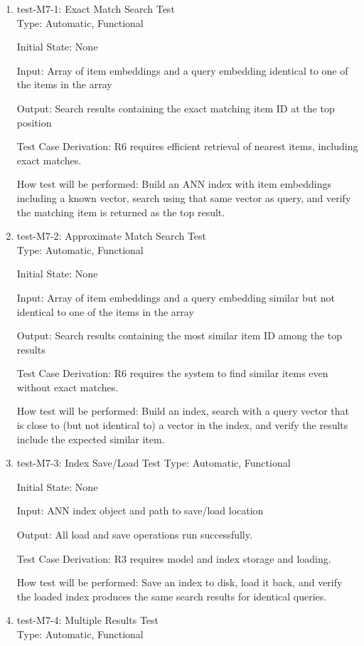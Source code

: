 \documentclass[12pt, titlepage]{article}
\begin{document}
\begin{enumerate}

  \item{test-M7-1: Exact Match Search Test\\}
  Type: Automatic, Functional
            
  Initial State: None
            
  Input: Array of item embeddings and a query embedding identical to one of the items in the array
            
  Output: Search results containing the exact matching item ID at the top position
  
  Test Case Derivation: R6 requires efficient retrieval of nearest items, including exact matches.
  
  How test will be performed: Build an ANN index with item embeddings including a known vector, search using that same vector as query, and verify the matching item is returned as the top result.
  
  \item{test-M7-2: Approximate Match Search Test\\}
  Type: Automatic, Functional
  
  Initial State: None
  
  Input: Array of item embeddings and a query embedding similar but not identical to one of the items in the array
  
  Output: Search results containing the most similar item ID among the top results
  
  Test Case Derivation: R6 requires the system to find similar items even without exact matches.
  
  How test will be performed: Build an index, search with a query vector that is close to (but not identical to) a vector in the index, and verify the results include the expected similar item.
  
  \item{test-M7-3: Index Save/Load Test}
  Type: Automatic, Functional
  
  Initial State: None
  
  Input: ANN index object and path to save/load location
  
  Output: All load and save operations run successfully.
  
  Test Case Derivation: R3 requires model and index storage and loading.
  
  How test will be performed: Save an index to disk, load it back, and verify the loaded index produces the same search results for identical queries.
  \item{test-M7-4: Multiple Results Test\\}
  Type: Automatic, Functional
  

\end{enumerate}
\end{document}
